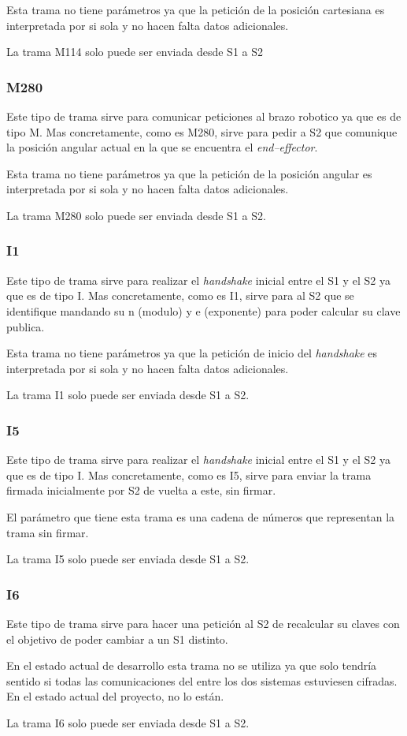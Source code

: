 Esta trama no tiene parámetros ya que la petición de la posición cartesiana es interpretada por si sola y no hacen falta datos adicionales.

La trama M114 solo puede ser enviada desde \ac{S1} a \ac{S2}

\subsubsection{M280}
Este tipo de trama sirve para comunicar peticiones al brazo robotico ya que es de tipo M. Mas concretamente, como es M280, sirve para pedir a \ac{S2} que comunique la posición angular
actual en la que se encuentra el \textit{end--effector}.

Esta trama no tiene parámetros ya que la petición de la posición angular es interpretada por si sola y no hacen falta datos adicionales.

La trama M280 solo puede ser enviada desde \ac{S1} a \ac{S2}.

\subsubsection{I1}
Este tipo de trama sirve para realizar el \textit{handshake} inicial entre el \ac{S1} y el \ac{S2} ya que es de tipo I. Mas concretamente, como es I1, sirve para al \ac{S2} que se identifique mandando su n (modulo) y e (exponente) para poder calcular su clave publica.

Esta trama no tiene parámetros ya que la petición de inicio del \textit{handshake} es interpretada por si sola y no hacen falta datos adicionales.

La trama I1 solo puede ser enviada desde \ac{S1} a \ac{S2}.

\subsubsection{I5}
Este tipo de trama sirve para realizar el \textit{handshake} inicial entre el \ac{S1} y el \ac{S2} ya que es de tipo I. Mas concretamente, como es I5, sirve para enviar la trama firmada inicialmente por \ac{S2} de vuelta a este, sin firmar. 

El parámetro que tiene esta trama es una cadena de números que representan la trama sin firmar.

La trama I5 solo puede ser enviada desde \ac{S1} a \ac{S2}.

\subsubsection{I6}
Este tipo de trama sirve para hacer una petición al \ac{S2} de recalcular su claves con el objetivo de poder cambiar a un \ac{S1} distinto.

En el estado actual de desarrollo esta trama no se utiliza ya que solo tendría sentido si todas las comunicaciones del entre los dos sistemas estuviesen cifradas. En el estado actual del proyecto, no lo están.

La trama I6 solo puede ser enviada desde \ac{S1} a \ac{S2}.




